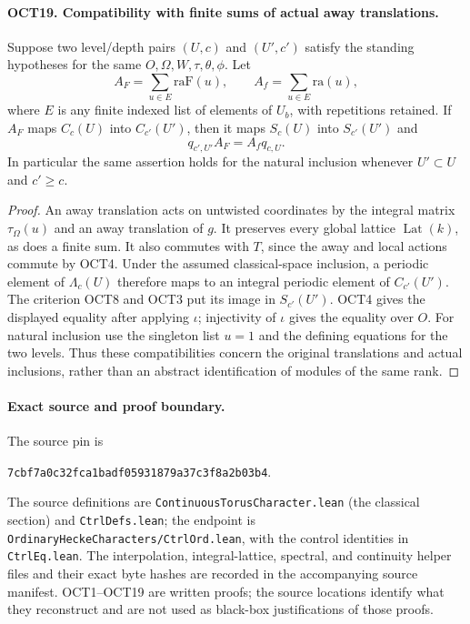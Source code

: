 \paragraph{OCT19. Compatibility with finite sums of actual away translations.}
\label{claim:OCT19}
Suppose two level/depth pairs $(U,c)$ and $(U',c')$ satisfy
the standing hypotheses for the same $O,\Omega,W,\tau,
\theta,\phi$.  Let
\[
       A_F=\sum_{u\in E}\mathrm{raF}(u),\qquad
       A_f=\sum_{u\in E}\mathrm{ra}(u),
\]
where $E$ is any finite indexed list of elements of $U_b$,
with repetitions retained.  If $A_F$ maps $C_c(U)$ into
$C_{c'}(U')$, then it maps $S_c(U)$ into $S_{c'}(U')$ and
\[
                         q_{c',U'}A_F=A_f q_{c,U}.
\]
In particular the same assertion holds for the natural
inclusion whenever $U'\subset U$ and $c'\geq c$.
\begin{proof}
An away translation acts on untwisted coordinates by the
integral matrix $\tau_\Omega(u)$ and an away translation
of $g$.  It preserves every global lattice
$\operatorname{Lat}(k)$, as does a finite sum.  It also
commutes with $T$, since the away and local actions commute
by OCT4.  Under the assumed classical-space inclusion, a
periodic element of $\Lambda_c(U)$ therefore maps to an
integral periodic element of $C_{c'}(U')$.  The criterion
OCT8 and OCT3 put its image in $S_{c'}(U')$.
OCT4 gives the displayed equality after applying $\iota$;
injectivity of $\iota$ gives the equality over $O$.
For natural inclusion use the singleton list $u=1$ and
the defining equations for the two levels.  Thus these
compatibilities concern the original translations and
actual inclusions, rather than an abstract identification
of modules of the same rank.
\end{proof}

\paragraph{Exact source and proof boundary.}
The source pin is
\begin{center}
\texttt{7cbf7a0c32fca1badf05931879a37c3f8a2b03b4}.
\end{center}
The source definitions are
\texttt{ContinuousTorusCharacter.lean} (the classical section)
and \texttt{CtrlDefs.lean}; the endpoint is
\texttt{OrdinaryHeckeCharacters/CtrlOrd.lean}, with the control
identities in \texttt{CtrlEq.lean}.  The interpolation,
integral-lattice, spectral, and continuity helper files and
their exact byte hashes are recorded in the accompanying
source manifest.  OCT1--OCT19 are written proofs; the source
locations identify what they reconstruct and are not used
as black-box justifications of those proofs.

